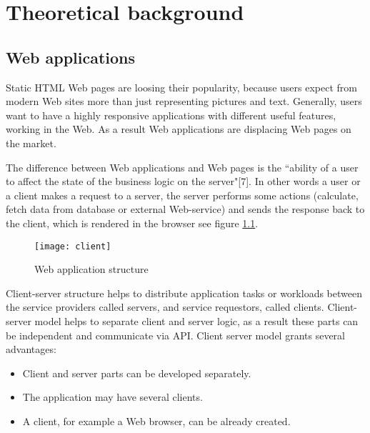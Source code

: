 \chapter{Theoretical background}
\label{ch:background} 
	\section{Web applications}
		
	  Static HTML Web pages are loosing their popularity, because users
	  expect from modern Web sites more than just representing pictures and text.
	  Generally, users want to have a highly responsive applications with
	  different useful features, working in the Web. As a result Web applications are displacing Web
	  pages on the market.
	  
	   The difference between Web applications and Web pages is the
	 ``ability of a user to affect the state of the business logic on the
	 server"[7]. In other words a user or a client makes a request to a server,
	 the server performs some actions (calculate, fetch data from database or
	 external Web-service) and sends the response back to the client, which is rendered in the browser see
	  figure \ref{fig:pic1}.
	  
	  \begin{figure}
      	\texttt{[image: client]}
      	\caption{Web application structure}
      	\label{fig:pic1}
      \end{figure}
	  
    	Client-server structure helps to distribute application tasks or workloads
    	between the service providers called servers, and service requestors,
    	called clients. Client-server model helps to separate client and server logic, as
    	a result these parts can be independent and communicate via API. Client
    	server model grants several advantages:
    	\begin{itemize}
    	  \item Client and server parts can be developed separately.
    	  \item The application may have several clients.
    	  \item A client, for example a Web browser, can be already created.
    	\end{itemize}
    		
